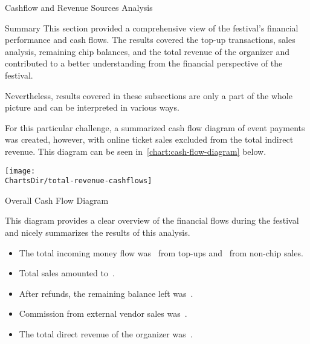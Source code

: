 \begin{section}{Cashflow and Revenue Sources Analysis}
\begin{subsection}{Summary}
		This section provided a comprehensive view of the festival's financial performance and cash flows.
		The results covered the top-up transactions, sales analysis, remaining chip balances, and the total revenue of the organizer and contributed to a better understanding from the financial perspective of the festival.

		Nevertheless, results covered in these subsections are only a part of the whole picture and can be interpreted in various ways.

		For this particular challenge, a summarized cash flow diagram of event payments was created, however, with online ticket sales excluded from the total indirect revenue.
		This diagram can be seen in~\autoref{chart:cash-flow-diagram} below.

		\begin{chart}[h]
			\centering
			\texttt{[image: \\ChartsDir/total-revenue-cashflows]}
			\caption{Overall Cash Flow Diagram}
			\label{chart:cash-flow-diagram}
			\source
		\end{chart}

		This diagram provides a clear overview of the financial flows during the festival and nicely summarizes the results of this analysis.

		\begin{keytakeaways}
			\begin{itemize}
				\item The total incoming money flow was~ from top-ups and~ from non-chip sales.
				\item Total sales amounted to~.
				\item After refunds, the remaining balance left was~.
				\item Commission from external vendor sales was~.
				\item The total direct revenue of the organizer was~.
			\end{itemize}
		\end{keytakeaways}
	\end{subsection}
\end{section}

